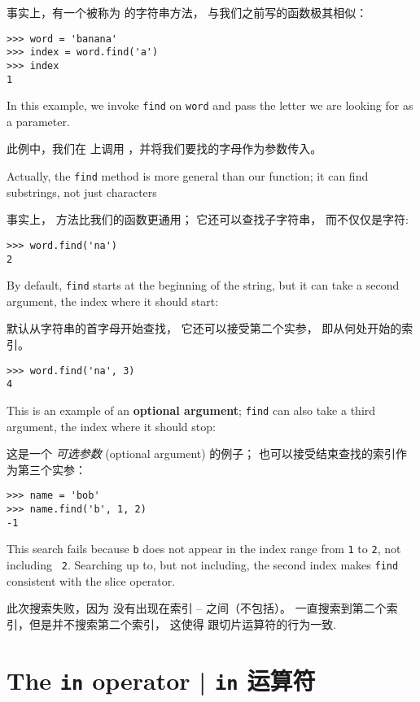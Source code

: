 事实上，有一个被称为  的字符串方法， 与我们之前写的函数极其相似：

\begin{lstlisting}
>>> word = 'banana'
>>> index = word.find('a')
>>> index
1
\end{lstlisting}

%
In this example, we invoke {\tt find} on {\tt word} and pass
the letter we are looking for as a parameter.

此例中，我们在  上调用  ，并将我们要找的字母作为参数传入。

Actually, the {\tt find} method is more general than our function;
it can find substrings, not just characters

事实上，  方法比我们的函数更通用； 它还可以查找子字符串， 而不仅仅是字符:


\begin{lstlisting}
>>> word.find('na')
2
\end{lstlisting}

%
By default, {\tt find} starts at the beginning of the string, but
it can take a second argument, the index where it should start:
  

 默认从字符串的首字母开始查找， 它还可以接受第二个实参， 即从何处开始的索引。

\begin{lstlisting}
>>> word.find('na', 3)
4
\end{lstlisting}

%
This is an example of an {\bf optional argument};
{\tt find} can
also take a third argument, the index where it should stop:

这是一个 {\em 可选参数} (optional argument) 的例子；  也可以接受结束查找的索引作为第三个实参：

\begin{lstlisting}
>>> name = 'bob'
>>> name.find('b', 1, 2)
-1
\end{lstlisting}

%
This search fails because {\tt b} does not
appear in the index range from {\tt 1} to {\tt 2}, not including {\tt
2}.  Searching up to, but not including, the second index makes
{\tt find} consistent with the slice operator.

此次搜索失败，因为  没有出现在索引 -- 之间（不包括）。 一直搜索到第二个索引，但是并不搜索第二个索引， 这使得  跟切片运算符的行为一致.

\section{The {\tt in} operator  |  {\tt in} 运算符}
\label{inboth}
  
  

